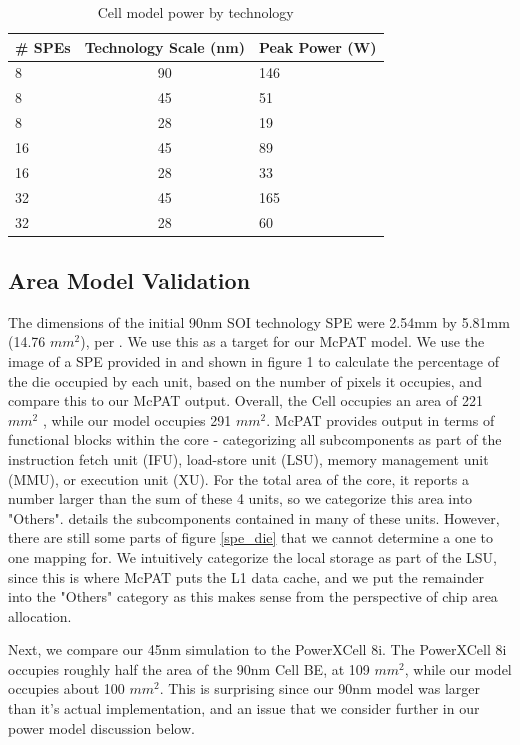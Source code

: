 \documentclass{sig-alternate-05-2015}
\begin{document}
\begin{table}[t]
\centering
\begin{tabular}{| l | c | l |} \hline
\# SPEs & Technology Scale (nm) & Peak Power (W) \\ \hline
8 & 90 & 146 \\ \hline  
8 & 45 & 51 \\ \hline  
8 & 28 & 19 \\ \hline  
16 & 45 & 89 \\ \hline  
16 & 28 & 33 \\ \hline  
32 & 45 & 165 \\ \hline  
32 & 28 & 60 \\ \hline  
\end{tabular}
\label{table:cell_model_power}
\caption{Cell model power by technology}
\end{table}

\subsection{Area Model Validation}

The dimensions of the initial 90nm SOI technology SPE were 2.54mm by 5.81mm (14.76 $mm^2$), per \cite{flachs2006microarchitecture}. We use this as a target for our McPAT model. We use the image of a SPE provided in \cite{flachs2006microarchitecture}  and shown in figure 1 to calculate the percentage of the die occupied by each unit, based on the number of pixels it occupies, and compare this to our McPAT output. Overall, the Cell occupies an area of 221 $mm^2$ \cite{realworldtech} , while our model occupies 291 $mm^2$. McPAT provides output in terms of functional blocks within the core - categorizing all subcomponents as part of the instruction fetch unit (IFU), load-store unit (LSU), memory management unit (MMU), or execution unit (XU). For the total area of the core, it reports a number larger than the sum of these 4 units, so we categorize this area into "Others". \cite{li2009mcpat} details the subcomponents contained in many of these units. However, there are still some parts of figure \ref{spe_die} that we cannot determine a one to one mapping for. We intuitively categorize the local storage as part of the LSU, since this is where McPAT puts the L1 data cache, and we put the remainder into the "Others" category as this makes sense from the perspective of chip area allocation.

Next, we compare our 45nm simulation to the PowerXCell 8i. The PowerXCell 8i occupies roughly half the area of the 90nm Cell BE, at 109 $mm^2$, while our model occupies about 100 $mm^2$. This is surprising since our 90nm model was larger than it's actual implementation, and an issue that we consider further in our power model discussion below.
\end{document}
